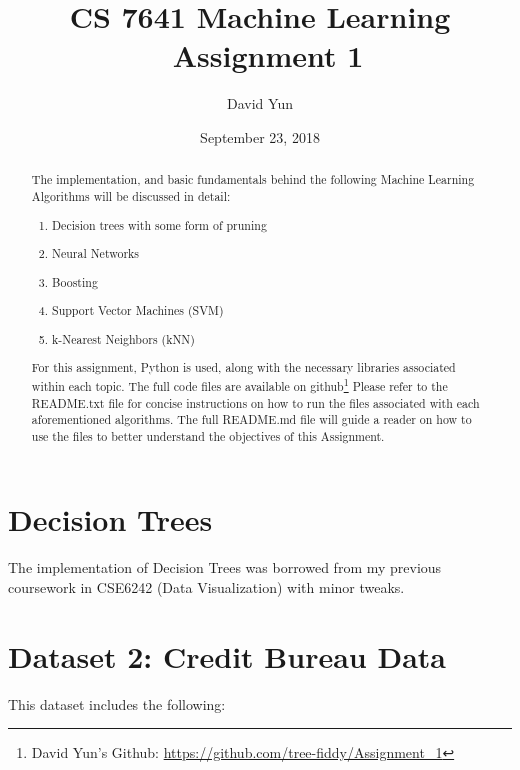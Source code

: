 \documentclass[letterpaper,12pt]{article}
\begin{document}
\title{CS 7641 Machine Learning \\
		\ Assignment 1 }
\author{David Yun}
\date{September 23, 2018}
\maketitle

\begin{abstract}
  The implementation, and basic fundamentals behind the following Machine Learning Algorithms will be discussed in detail:  
  \begin{enumerate}
    \item Decision trees with some form of pruning
    \item Neural Networks
    \item Boosting
    \item Support Vector Machines (SVM)
    \item k-Nearest Neighbors (kNN)
      
    \end{enumerate}

    For this assignment, Python is used, along with the necessary libraries associated within each topic.  The full code files are available on github\footnote{David Yun's Github: \url{https://github.com/tree-fiddy/Assignment_1}}
    Please refer to the README.txt file for concise instructions on how to run the files associated with each aforementioned algorithms.  The full README.md file will guide a reader on how to use the files to better understand the objectives of this Assignment.  

\end{abstract}

\tableofcontents

\section{Decision Trees}

The implementation of Decision Trees was borrowed from my previous coursework in CSE6242 (Data Visualization) with minor tweaks.  

\subsection{}


\section{Dataset 2:  Credit Bureau Data}
This dataset includes the following:
\end{document}
